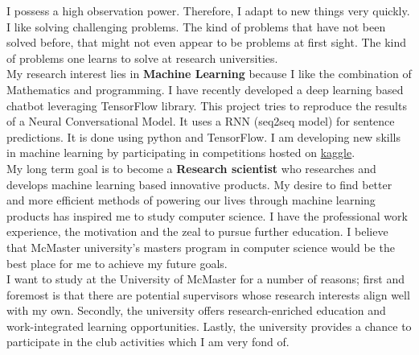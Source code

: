 \documentclass{article}
\begin{document}
I possess a high observation power. Therefore, I adapt to new things very quickly. I like solving challenging problems. The kind of problems that have not been solved before, that might not even appear to be problems at first sight. The kind of problems one learns to solve at research universities.\\

My research interest lies in \textbf{Machine Learning} because I like the combination of Mathematics and programming. I have recently developed a deep learning based chatbot leveraging TensorFlow library. This project tries to reproduce the results of a Neural Conversational Model. It uses a RNN (seq2seq model) for sentence predictions. It is done using python and TensorFlow. I am developing new skills in machine learning by participating in competitions hosted on \href{https://www.kaggle.com/}{kaggle}.\\

My long term goal is to become a \textbf{Research scientist} who researches and develops machine learning based innovative products. My desire to find better and more efficient methods of powering our lives through machine learning products has inspired me to study computer science. I have the professional work experience, the motivation and the zeal to pursue further education. I believe that McMaster university’s masters program in computer science would be the best place for me to achieve my future goals.\\

I want to study at the University of McMaster for a number of reasons; first and foremost is that there are potential supervisors whose research interests align well with my own. Secondly, the university offers research-enriched education and work-integrated learning opportunities. Lastly, the university provides a chance to participate in the club activities which I am very fond of.

  
\end{document}
